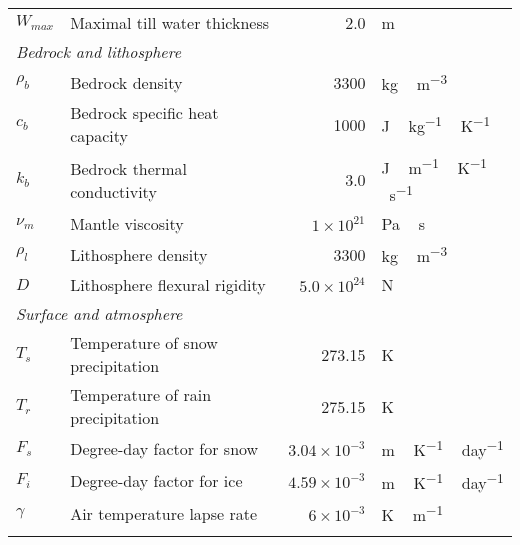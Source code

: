 \documentclass[tc]{copernicus}
\begin{document}
\begin{table*}
{\begin{tabular}{llrl}
    $W_{max}$ & Maximal till water thickness
            & 2.0
            & m \\

    \multicolumn{2}{l}{\emph{Bedrock and lithosphere}} \\

    $\rho_b$& Bedrock density
            & 3300
            & \unit{kg\,m^{-3}} \\

    $c_b$   & Bedrock specific heat capacity
            & 1000
            & \unit{J\,kg^{-1}\,K^{-1}} \\

    $k_b$   & Bedrock thermal conductivity
            & 3.0
            & \unit{J\,m^{-1}\,K^{-1}\,s^{-1}} \\

    $\nu_m$ & Mantle viscosity
            & $1\times10^{21}$
            & \unit{Pa\,s} \\

    $\rho_l$& Lithosphere density
            & 3300
            & \unit{kg\,m^{-3}} \\

    $D$     & Lithosphere flexural rigidity
            & $5.0\times10^{24}$
            & \unit{N} \\

    \multicolumn{2}{l}{\emph{Surface and atmosphere}} \\

    $T_s$   & Temperature of snow precipitation
            & 273.15
            & \unit{K} \\

    $T_r$   & Temperature of rain precipitation
            & 275.15
            & \unit{K} \\

    $F_s$   & Degree-day factor for snow
            & $3.04\times10^{-3}$
            & \unit{m\,K^{-1}\,day^{-1}} \\

    $F_i$   & Degree-day factor for ice
            & $4.59\times10^{-3}$
            & \unit{m\,K^{-1}\,day^{-1}} \\

    $\gamma$& Air temperature lapse rate
            & $6\times10^{-3}$
            & \unit{K\,m^{-1}} \\

    \bottomhline
  \end{tabular}}
  \belowtable{}
\end{table*}
\end{document}
